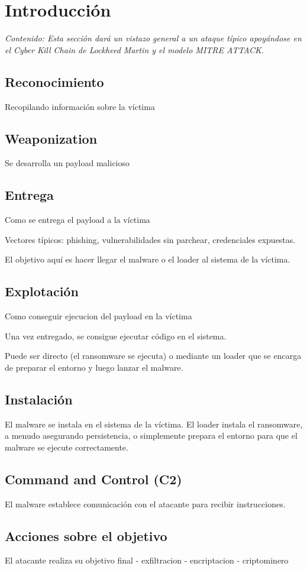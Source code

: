 \chapter{Introducción}

\textit{Contenido: Esta sección dará un vistazo general a un ataque típico 
apoyándose en el Cyber Kill Chain de Lockheed Martin y el modelo MITRE ATTACK.}
\vspace{1em}

\section{Reconocimiento}

Recopilando información sobre la víctima

\section{Weaponization}

Se desarrolla un payload malicioso

\section{Entrega}

Como se entrega el payload a la víctima

Vectores típicos: phishing, vulnerabilidades sin parchear, credenciales expuestas.

El objetivo aquí es hacer llegar el malware o el loader al sistema de la víctima.

\section{Explotación}

Como conseguir ejecucion del payload en la víctima

Una vez entregado, se consigue ejecutar código en el sistema.

Puede ser directo (el ransomware se ejecuta) o mediante un loader que se encarga 
de preparar el entorno y luego lanzar el malware.

\section{Instalación}

El malware se instala en el sistema de la víctima.
El loader instala el ransomware, a menudo asegurando persistencia, o simplemente 
prepara el entorno para que el malware se ejecute correctamente.

\section{Command and Control (C2)}

El malware establece comunicación con el atacante para recibir instrucciones.

\section{Acciones sobre el objetivo}

El atacante realiza su objetivo final
- exfiltracion
- encriptacion
- criptominero